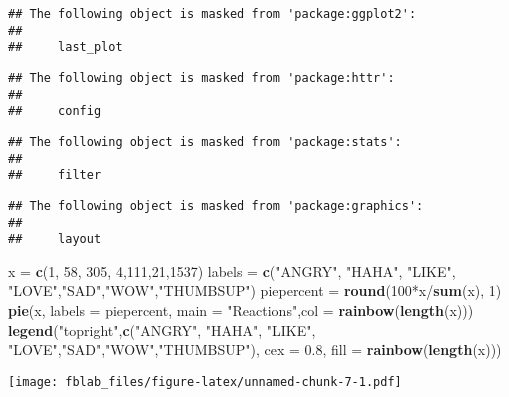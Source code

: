 \documentclass[]{article}
\newenvironment{Shaded}{\begin{snugshade}}{\end{snugshade}}
\newcommand{\KeywordTok}[1]{\textcolor[rgb]{0.13,0.29,0.53}{\textbf{{#1}}}}
\newcommand{\DataTypeTok}[1]{\textcolor[rgb]{0.13,0.29,0.53}{{#1}}}
\newcommand{\DecValTok}[1]{\textcolor[rgb]{0.00,0.00,0.81}{{#1}}}
\newcommand{\FloatTok}[1]{\textcolor[rgb]{0.00,0.00,0.81}{{#1}}}
\newcommand{\StringTok}[1]{\textcolor[rgb]{0.31,0.60,0.02}{{#1}}}
\newcommand{\NormalTok}[1]{{#1}}
\begin{document}
\begin{verbatim}
## The following object is masked from 'package:ggplot2':
## 
##     last_plot
\end{verbatim}

\begin{verbatim}
## The following object is masked from 'package:httr':
## 
##     config
\end{verbatim}

\begin{verbatim}
## The following object is masked from 'package:stats':
## 
##     filter
\end{verbatim}

\begin{verbatim}
## The following object is masked from 'package:graphics':
## 
##     layout
\end{verbatim}

\begin{Shaded}
\begin{Highlighting}[]
\NormalTok{x =}\StringTok{ }\KeywordTok{c}\NormalTok{(}\DecValTok{1}\NormalTok{, }\DecValTok{58}\NormalTok{, }\DecValTok{305}\NormalTok{, }\DecValTok{4}\NormalTok{,}\DecValTok{111}\NormalTok{,}\DecValTok{21}\NormalTok{,}\DecValTok{1537}\NormalTok{)}
\NormalTok{labels =}\StringTok{ }\KeywordTok{c}\NormalTok{(}\StringTok{"ANGRY"}\NormalTok{, }\StringTok{"HAHA"}\NormalTok{, }\StringTok{"LIKE"}\NormalTok{, }\StringTok{"LOVE"}\NormalTok{,}\StringTok{"SAD"}\NormalTok{,}\StringTok{"WOW"}\NormalTok{,}\StringTok{"THUMBSUP"}\NormalTok{)}
\NormalTok{piepercent =}\StringTok{ }\KeywordTok{round}\NormalTok{(}\DecValTok{100}\NormalTok{*x/}\KeywordTok{sum}\NormalTok{(x), }\DecValTok{1}\NormalTok{)}
\KeywordTok{pie}\NormalTok{(x, }\DataTypeTok{labels =} \NormalTok{piepercent, }\DataTypeTok{main =} \StringTok{"Reactions"}\NormalTok{,}\DataTypeTok{col =} \KeywordTok{rainbow}\NormalTok{(}\KeywordTok{length}\NormalTok{(x)))}
\KeywordTok{legend}\NormalTok{(}\StringTok{"topright"}\NormalTok{,}\KeywordTok{c}\NormalTok{(}\StringTok{"ANGRY"}\NormalTok{, }\StringTok{"HAHA"}\NormalTok{, }\StringTok{"LIKE"}\NormalTok{, }\StringTok{"LOVE"}\NormalTok{,}\StringTok{"SAD"}\NormalTok{,}\StringTok{"WOW"}\NormalTok{,}\StringTok{"THUMBSUP"}\NormalTok{), }\DataTypeTok{cex =} \FloatTok{0.8}\NormalTok{,}
   \DataTypeTok{fill =} \KeywordTok{rainbow}\NormalTok{(}\KeywordTok{length}\NormalTok{(x)))}
\end{Highlighting}
\end{Shaded}

\texttt{[image: fblab\_files/figure-latex/unnamed-chunk-7-1.pdf]}
\end{document}
